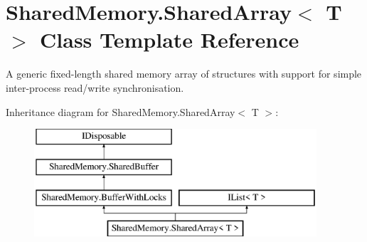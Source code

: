 \hypertarget{class_shared_memory_1_1_shared_array}{}\section{Shared\+Memory.\+Shared\+Array$<$ T $>$ Class Template Reference}
\label{class_shared_memory_1_1_shared_array}


A generic fixed-\/length shared memory array of structures with support for simple inter-\/process read/write synchronisation.  


Inheritance diagram for Shared\+Memory.\+Shared\+Array$<$ T $>$\+:\begin{figure}[H]
\begin{center}
\leavevmode
\includegraphics[height=4.000000cm]{class_shared_memory_1_1_shared_array}
\end{center}
\end{figure}
